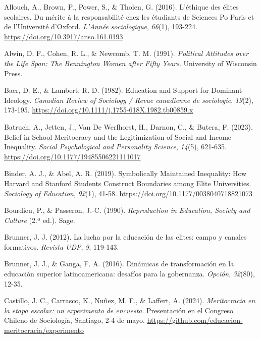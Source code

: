\documentclass[
  spanish,
  a4paper,
  oneside]{scrbook}
\newlength{\cslhangindent}
\newenvironment{CSLReferences}[2] %
 {\begin{list}{}{%
  \setlength{\itemindent}{0pt}
  \setlength{\leftmargin}{0pt}
  \setlength{\parsep}{0pt}
  \ifodd #1
   \setlength{\leftmargin}{\cslhangindent}
   \setlength{\itemindent}{-1\cslhangindent}
  \fi
  \setlength{\itemsep}{#2\baselineskip}}}
 {\end{list}}
\begin{document}
\protect{}\label{refs}
\begin{CSLReferences}{1}{0}
Allouch, A., Brown, P., Power, S., \& Tholen, G. (2016). L'éthique des
élites scolaires. Du mérite à la responsabilité chez les étudiants de
Sciences Po Paris et de l'Université d'Oxford. \emph{L'Année
sociologique}, \emph{66}(1), 193-224.
\url{https://doi.org/10.3917/anso.161.0193}

Alwin, D. F., Cohen, R. L., \& Newcomb, T. M. (1991). \emph{Political
Attitudes over the Life Span: The Bennington Women after Fifty Years}.
University of Wisconsin Press.

Baer, D. E., \& Lambert, R. D. (1982). Education and Support for
Dominant Ideology. \emph{Canadian Review of Sociology / Revue canadienne
de sociologie}, \emph{19}(2), 173-195.
\url{https://doi.org/10.1111/j.1755-618X.1982.tb00859.x}

Batruch, A., Jetten, J., Van De Werfhorst, H., Darnon, C., \& Butera, F.
(2023). Belief in {School Meritocracy} and the {Legitimization} of
{Social} and {Income Inequality}. \emph{Social Psychological and
Personality Science}, \emph{14}(5), 621-635.
\url{https://doi.org/10.1177/19485506221111017}

Binder, A. J., \& Abel, A. R. (2019). Symbolically Maintained
Inequality: How Harvard and Stanford Students Construct Boundaries among
Elite Universities. \emph{Sociology of Education}, \emph{92}(1), 41-58.
\url{https://doi.org/10.1177/0038040718821073}

Bourdieu, P., \& Passeron, J.-C. (1990). \emph{Reproduction in
Education, Society and Culture} (2.ª ed.). Sage.

Brunner, J. J. (2012). La lucha por la educación de las elites: campo y
canales formativos. \emph{Revista UDP}, \emph{9}, 119-143.

Brunner, J. J., \& Ganga, F. A. (2016). Dinámicas de transformación en
la educación superior latinoamericana: desafíos para la gobernanza.
\emph{Opción}, \emph{32}(80), 12-35.

Castillo, J. C., Carrasco, K., Nuñez, M. F., \& Laffert, A. (2024).
\emph{Meritocracia en la etapa escolar: un experimento de encuesta}.
Presentación en el Congreso Chileno de Sociología, Santiago, 2-4 de
mayo. \url{https://github.com/educacion-meritocracia/experimento}


\end{CSLReferences}
\end{document}
